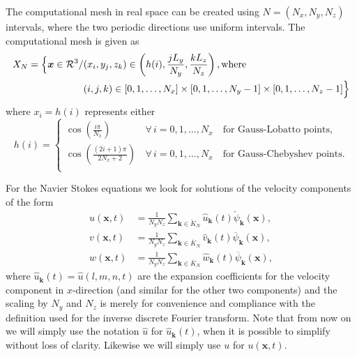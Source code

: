 \documentclass[11pt, oneside]{article}
\newcommand{\N}[1]{\check{#1}}
\newcommand{\D}[1]{\overline{#1}}
\begin{document}
The computational mesh in real space can be created using $N = (N_x, N_y, 
N_z)$ intervals, where the two periodic directions use uniform intervals. The 
computational mesh is given as
\begin{align}
  X_N = \Big\{ \bm{x} \in \mathcal{R}^3/&(x_i, y_j, z_k) \in \left( h(i), \frac{jL_y}{N_y}, \frac{kL_z}{N_z} \right), \text{where} \notag \\
  &(i, j, k) \in [0, 1, \ldots, N_x] \times [0, 1, \ldots, N_y-1] \times [0, 1, \ldots, N_z-1] \Big\} \label{eq:Xn}
\end{align}
where $x_i = h(i)$ represents either
\begin{equation}
 h(i) = \begin{cases}
   \cos \left(\frac{i \pi }{N_x} \right) \, &\forall \, i=0,1, \ldots, N_x \quad  \text{for Gauss-Lobatto points}, \\
   \cos \left(\frac{(2i +1)\pi}{2N_x+2} \right) \, &\forall \, i=0,1, \ldots, N_x \quad  \text{for Gauss-Chebyshev points}. \\
 \end{cases}
\end{equation}

For the Navier Stokes equations we look for solutions of the velocity 
components of the form
\begin{align}
u(\bm{x}, t) &= \frac{1}{N_yN_z}\sum_{\bm{k} \in \N{K}_N} \hat{u}_{\bm{k}}(t) 
\N{\psi}_{\bm{k}}(\bm{x}), \label{eq:u_solx} \\
v(\bm{x}, t) &= \frac{1}{N_yN_z}\sum_{\bm{k} \in \D{K}_N} \hat{v}_{\bm{k}}(t) 
\D{\psi}_{\bm{k}}(\bm{x}), \label{eq:u_soly} \\
w(\bm{x}, t) &= \frac{1}{N_yN_z}\sum_{\bm{k} \in \D{K}_N} \hat{w}_{\bm{k}}(t) 
\D{\psi}_{\bm{k}}(\bm{x}), \label{eq:u_solz}
\end{align}
where $\hat{u}_{\bm{k}}(t) = \hat{u}(l, {m}, {n}, t)$ are the expansion 
coefficients for the velocity component in $x$-direction (and similar for the 
other two components) and the scaling by $N_y$ and $N_z$ is merely for 
convenience 
and compliance with the definition used for the inverse discrete Fourier 
transform. Note that from now on we will simply use the notation $\hat{u}$ for 
$\hat{u}_{\bm{k}}(t)$, when it is possible to simplify without loss of clarity. 
Likewise we will simply use $u$ for $u(\bm{x}, t)$. 
\end{document}
